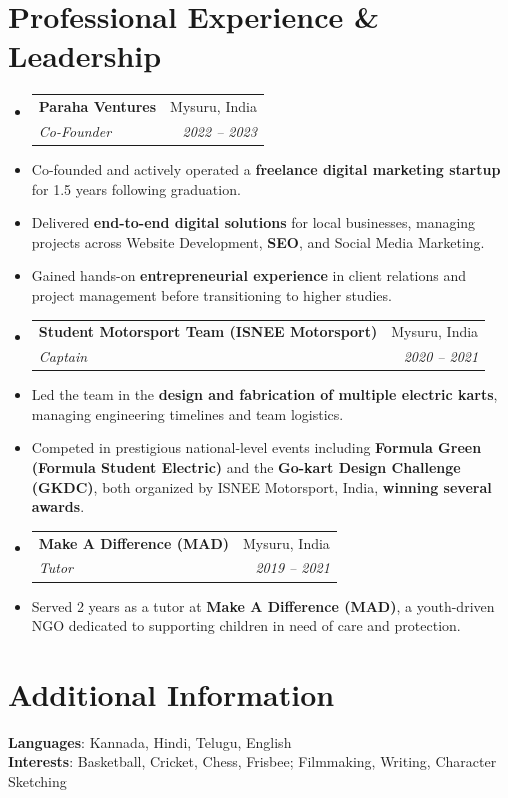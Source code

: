 \documentclass[a4paper,10pt]{article}
\makeatletter
\newcommand{\resumeItem}[1]{
	\item\small{#1}
	\vspace{1pt}
}
\newcommand{\resumeSubheading}[4]{
	\vspace{4pt}\item
	\begin{tabular*}{0.99\textwidth}[t]{l@{\extracolsep{\fill}}r}
		\textbf{#1} & #2 \\
		\textit{\small#3} & \textit{\small #4} \\
	\end{tabular*}\vspace{3pt}
}
\makeatother
\begin{document}
	\section{Professional Experience \& Leadership}
	\begin{itemize}[leftmargin=0.15in, label={}]
		
		\resumeSubheading
		{Paraha Ventures}{Mysuru, India}
		{Co-Founder}{2022 -- 2023}
		\vspace{-6pt}
		\resumeItem{Co-founded and actively operated a \textbf{freelance digital marketing startup} for 1.5 years following graduation.}
		\resumeItem{Delivered \textbf{end-to-end digital solutions} for local businesses, managing projects across Website Development, \textbf{SEO}, and Social Media Marketing.}
		\resumeItem{Gained hands-on \textbf{entrepreneurial experience} in client relations and project management before transitioning to higher studies.}
		\vspace{-9pt}
		
		\resumeSubheading
		{Student Motorsport Team (ISNEE Motorsport)}{Mysuru, India}
		{Captain}{2020 -- 2021}
		\vspace{-9pt}
		\resumeItem{Led the team in the \textbf{design and fabrication of multiple electric karts}, managing engineering timelines and team logistics.}
		\resumeItem{Competed in prestigious national-level events including \textbf{Formula Green (Formula Student Electric)} and the \textbf{Go-kart Design Challenge (GKDC)}, both organized by ISNEE Motorsport, India, \textbf{winning several awards}.}
		\vspace{3pt}
		
		\resumeSubheading
		{Make A Difference (MAD)}{Mysuru, India}
		{Tutor}{2019 -- 2021}
		\vspace{-9pt}
		\resumeItem{Served 2 years as a tutor at \textbf{Make A Difference (MAD)}, a youth-driven NGO dedicated to supporting children in need of care and protection.}
	\end{itemize}
	
	\section{Additional Information}
	\begin{itemize}[leftmargin=0.15in, label={}]
		\small{\item{
				\textbf{Languages}{: Kannada, Hindi, Telugu, English} \\
				\textbf{Interests}{: Basketball, Cricket, Chess, Frisbee; Filmmaking, Writing, Character Sketching}
		}}
	\end{itemize}
	
\end{document}
